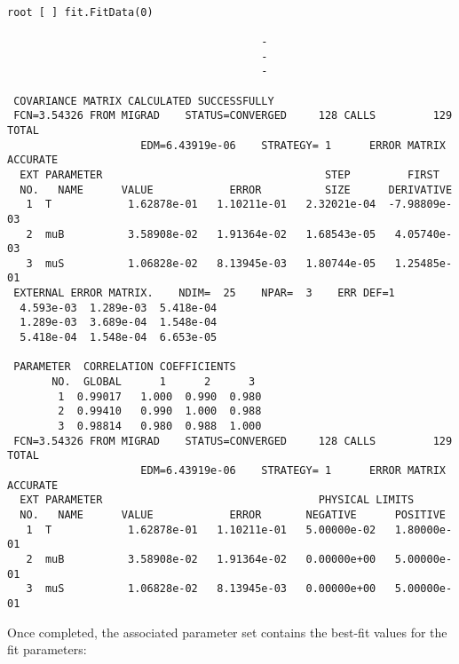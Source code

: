 \documentclass{elsarticle}
\begin{document}
\small
\begin{verbatim}

root [ ] fit.FitData(0)  

                                        -
                                        -
                                        -

 COVARIANCE MATRIX CALCULATED SUCCESSFULLY
 FCN=3.54326 FROM MIGRAD    STATUS=CONVERGED     128 CALLS         129 TOTAL
                     EDM=6.43919e-06    STRATEGY= 1      ERROR MATRIX ACCURATE
  EXT PARAMETER                                   STEP         FIRST
  NO.   NAME      VALUE            ERROR          SIZE      DERIVATIVE
   1  T            1.62878e-01   1.10211e-01   2.32021e-04  -7.98809e-03
   2  muB          3.58908e-02   1.91364e-02   1.68543e-05   4.05740e-03
   3  muS          1.06828e-02   8.13945e-03   1.80744e-05   1.25485e-01
 EXTERNAL ERROR MATRIX.    NDIM=  25    NPAR=  3    ERR DEF=1
  4.593e-03  1.289e-03  5.418e-04
  1.289e-03  3.689e-04  1.548e-04
  5.418e-04  1.548e-04  6.653e-05

 PARAMETER  CORRELATION COEFFICIENTS
       NO.  GLOBAL      1      2      3
        1  0.99017   1.000  0.990  0.980
        2  0.99410   0.990  1.000  0.988
        3  0.98814   0.980  0.988  1.000
 FCN=3.54326 FROM MIGRAD    STATUS=CONVERGED     128 CALLS         129 TOTAL
                     EDM=6.43919e-06    STRATEGY= 1      ERROR MATRIX ACCURATE
  EXT PARAMETER                                  PHYSICAL LIMITS
  NO.   NAME      VALUE            ERROR       NEGATIVE      POSITIVE
   1  T            1.62878e-01   1.10211e-01   5.00000e-02   1.80000e-01
   2  muB          3.58908e-02   1.91364e-02   0.00000e+00   5.00000e-01
   3  muS          1.06828e-02   8.13945e-03   0.00000e+00   5.00000e-01
\end{verbatim}
\normalsize

Once completed, the associated parameter set contains the best-fit values for the fit parameters:
\end{document}
